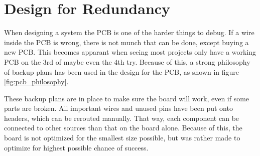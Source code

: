 \documentclass[../main/report.tex]{subfiles}
\begin{document}
\section{Design for Redundancy}

When designing a system the PCB is one of the harder things to debug.
If a wire inside the PCB is wrong, there is not munch that can be done, except buying a new PCB.
This becomes apparant when seeing most projects only have a working PCB on the 3rd of maybe even the 4th try. 
Because of this, a strong philosophy of backup plans has been used in the design for the PCB, as shown in figure \ref{fig:pcb_philosophy}.

These backup plans are in place to make sure the board will work, even if some parts are broken.
All important wires and unused pins have been put onto headers, which can be rerouted manually.
That way, each component can be connected to other sources than that on the board alone.
Because of this, the board is not optimized for the smallest size possible, but was rather made to optimize for highest possible chance of success.
\end{document}
